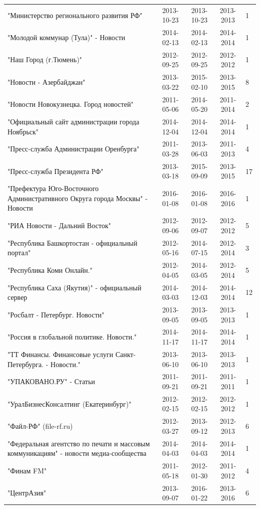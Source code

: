 \begin{longtable}{p{6cm}cccp{2cm}}
"Министерство регионального развития РФ" & 2013-10-23 & 2013-10-23 & 2013-2013 & 1\\
"Молодой коммунар (Тула)" - Новости & 2014-02-13 & 2014-02-13 & 2014-2014 & 1\\
"Наш Город (г.Тюмень)" & 2012-09-25 & 2012-09-25 & 2012-2012 & 1\\
"Новости - Азербайджан" & 2013-03-22 & 2015-02-10 & 2013-2015 & 8\\
"Новости Новокузнецка. Город новостей" & 2011-05-06 & 2014-05-20 & 2011-2014 & 2\\
"Официальный сайт администрации города Ноябрьск" & 2014-12-04 & 2014-12-04 & 2014-2014 & 1\\
"Пресс-служба Администрации Оренбурга" & 2011-03-28 & 2013-06-03 & 2011-2013 & 4\\
"Пресс-служба Президента РФ" & 2013-03-18 & 2015-09-09 & 2013-2015 & 17\\
"Префектура Юго-Восточного Административного Округа города Москвы" - Новости & 2016-01-08 & 2016-01-08 & 2016-2016 & 1\\
"РИА Новости - Дальний Восток" & 2012-09-06 & 2012-09-07 & 2012-2012 & 5\\
"Республика Башкортостан - официальный портал" & 2012-05-16 & 2014-07-15 & 2012-2014 & 3\\
"Республика Коми Онлайн." & 2012-04-05 & 2014-03-05 & 2012-2014 & 5\\
"Республика Саха (Якутия)" - официальный сервер & 2014-03-03 & 2014-12-03 & 2014-2014 & 12\\
"Росбалт - Петербург. Новости" & 2013-09-05 & 2013-09-05 & 2013-2013 & 1\\
"Россия в глобальной политике. Новости." & 2014-11-17 & 2014-11-17 & 2014-2014 & 1\\
"ТТ Финансы. Финансовые услуги Санкт-Петербурга. - Новости." & 2013-06-10 & 2013-06-10 & 2013-2013 & 1\\
"УПАКОВАНО.РУ" - Статьи & 2011-09-21 & 2011-09-21 & 2011-2011 & 1\\
"УралБизнесКонсалтинг (Екатеринбург)" & 2012-02-15 & 2012-02-15 & 2012-2012 & 1\\
"Файл-РФ" (file-rf.ru) & 2012-03-27 & 2013-09-12 & 2012-2013 & 6\\
"Федеральная агентство по печати и массовым коммуникациям" - новости медиа-сообщества & 2014-04-03 & 2014-04-03 & 2014-2014 & 1\\
"Финам FM" & 2011-05-18 & 2012-01-30 & 2011-2012 & 4\\
"ЦентрАзия" & 2013-09-07 & 2016-01-22 & 2013-2016 & 6\\

\end{longtable}
